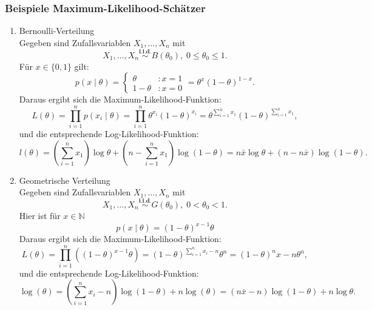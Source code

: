 \documentclass[10pt]{article}
\newcommand{\FZV}{X_1, \ldots, X_n} %
\newcommand{\xt}{x \mid \theta} %
\begin{document}
	\subsubsection{Beispiele Maximum-Likelihood-Schätzer}
		\begin{enumerate}[label = (\roman*)]
		\item Bernoulli-Verteilung \\
		Gegeben sind Zufallsvariablen $\FZV$ mit
		\begin{equation*}
			\FZV \overset{\textbf{i.i.d.}}{\sim} B(\theta_0), \; 0 \leq \theta_0 \leq 1.
		\end{equation*} 
		Für $x \in \{0,1\}$ gilt:
		\begin{equation*}
			p(\xt) = \begin{cases}
				\theta &: x=1 \\
				1- \theta&: x=0
			\end{cases} = \theta^x (1-\theta)^{1-x}.
		\end{equation*}
		Daraus ergibt sich die Maximum-Likelihood-Funktion:
		\begin{equation*}
			L(\theta) = \prod_{i=1}^{n} p(x_i \mid \theta) =\prod_{i=1}^{n} \theta^{x_i} (1-\theta)^{x_i} = \theta^{\sum_{i=1}^{n}x_1}(1-\theta)^{\sum_{i=1}^{n}x_1},
		\end{equation*}
		und die entsprechende Log-Likelihood-Funktion:
		\begin{equation*}
			l(\theta) = \left(\sum_{i=1}^{n}x_1\right) \log \theta + \left(n-\sum_{i=1}^{n}x_1\right) \log(1-\theta) = n\bar{x}\log\theta + (n-n\bar{x})\log(1-\theta).
		\end{equation*}
	
		
		\item Geometrische Verteilung \\
		Gegeben sind Zufallsvariablen $\FZV$ mit
		\begin{equation*}
			\FZV \overset{\textbf{i.i.d.}}{\sim} G(\theta_0), \; 0 < \theta_0 < 1.
		\end{equation*} 
		Hier ist für $x\in \mathbb{N}$
		\begin{equation*}
			p(\xt)=(1-\theta)^{x-1}\theta
		\end{equation*}
		Daraus ergibt sich die Maximum-Likelihood-Funktion:
		\begin{equation*}
			L (\theta) = \prod_{i=1}^{n} ((1-\theta)^{x-1}\theta) = (1-\theta)^{\sum_{i=1}^{n}x_i -n} \theta^n = (1-\theta)^nx-n \theta^n,
		\end{equation*}
		und die entsprechende Log-Likelihood-Funktion:
		\begin{equation*}
			\log(\theta)= (\sum_{i=1}^{n}x_i -n)\log(1-\theta)+n\log(\theta) = (n\bar{x}-n)\log(1-\theta)+ n\log\theta.
		\end{equation*}
		

\end{enumerate}
\end{document}
